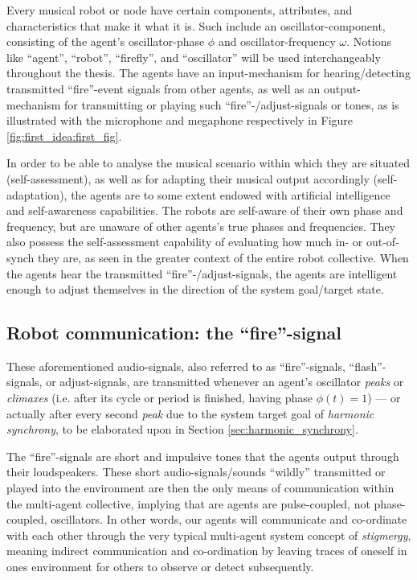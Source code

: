 		Every musical robot or node have certain components, attributes, and characteristics that make it what it is. Such include an oscillator-component, consisting of the agent's oscillator-phase $\phi$ and oscillator-frequency $\omega$. Notions like ``agent'', ``robot'', ``firefly'', and ``oscillator'' will be used interchangeably throughout the thesis. The agents have an input-mechanism for hearing/detecting transmitted ``fire''-event signals from other agents, as well as an output-mechanism for transmitting or playing such ``fire''-/adjust-signals or tones, as is illustrated with the microphone and megaphone respectively in Figure \ref{fig:first_idea:first_fig}.
		
		In order to be able to analyse the musical scenario within which they are situated (self-assessment), as well as for adapting their musical output accordingly (self-adaptation), the agents are to some extent endowed with artificial intelligence and self-awareness capabilities. The robots are self-aware of their own phase and frequency, but are unaware of other agents's true phases and frequencies. They also possess the self-assessment capability of evaluating how much in- or out-of-synch they are, as seen in the greater context of the entire robot collective. When the agents hear the transmitted ``fire''-/adjust-signals, the agents are intelligent enough to adjust themselves in the direction of the system goal/target state.

		



	\subsection{Robot communication: the ``fire''-signal}
	\label{subsec:fire_signal}
	
	These aforementioned audio-signals, also referred to as ``fire''-signals, ``flash''-signals, or adjust-signals, are transmitted whenever an agent's oscillator \textit{peaks} or \textit{climaxes} (i.e. after its cycle or period is finished, having phase $\phi(t)=1$) — or actually after every second \textit{peak} due to the system target goal of \textit{harmonic synchrony}, to be elaborated upon in Section \ref{sec:harmonic_synchrony}.

	The ``fire''-signals are short and impulsive tones that the agents output through their loudspeakers. These short audio-signals/sounds ``wildly'' transmitted or played into the environment are then the only means of communication within the multi-agent collective, implying that are agents are pulse-coupled, not phase-coupled, oscillators. In other words, our agents will communicate and co-ordinate with each other through the very typical multi-agent system concept of \textit{stigmergy}, meaning indirect communication and co-ordination by leaving traces of oneself in ones environment for others to observe or detect subsequently.
	
